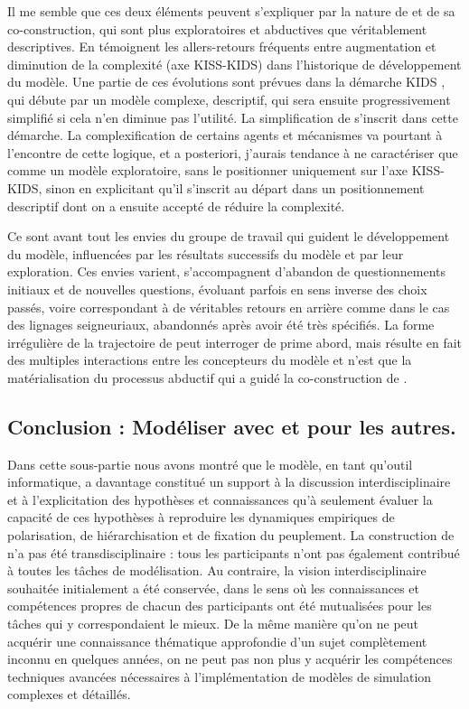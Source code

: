 Il me semble que ces deux éléments peuvent s'expliquer par la nature de \simfeodal{} et de sa co-construction, qui sont plus exploratoires et abductives que véritablement descriptives.
En témoignent les allers-retours fréquents entre augmentation et diminution de la complexité (axe KISS-KIDS) dans l'historique de développement du modèle.
Une partie de ces évolutions sont prévues dans la démarche KIDS \autocite{edmonds_kiss_2005}, qui débute par un modèle \og complexe\fg{}, descriptif, qui sera ensuite progressivement simplifié si cela n'en diminue pas l'utilité.
La \og simplification\fg{} de \simfeodal{} s'inscrit dans cette démarche.
La complexification de certains agents et mécanismes va pourtant à l'encontre de cette logique, et a posteriori, j'aurais tendance à ne caractériser \simfeodal{} que comme un modèle exploratoire, sans le positionner uniquement sur l'axe KISS-KIDS, sinon en explicitant qu'il s'inscrit au départ dans un positionnement descriptif dont on a ensuite accepté de réduire la complexité.

Ce sont avant tout les envies du groupe de travail qui guident le développement du modèle, influencées par les résultats successifs du modèle et par leur exploration.
Ces envies varient, s'accompagnent d'abandon de questionnements initiaux et de nouvelles questions, évoluant parfois en sens inverse des choix passés, voire correspondant à de véritables \og retours en arrière\fg{} comme dans le cas des lignages seigneuriaux, abandonnés après avoir été très spécifiés.
La forme irrégulière de la trajectoire de \simfeodal{} peut interroger de prime abord, mais résulte en fait des multiples interactions entre les concepteurs du modèle et n'est que la matérialisation du processus abductif qui a guidé la co-construction de \simfeodal{}.

\subsection{Conclusion : Modéliser avec et pour les autres.}

Dans cette sous-partie nous avons montré que le modèle, en tant qu'outil informatique, a davantage constitué un support à la discussion interdisciplinaire et à l'explicitation des hypothèses et connaissances qu'à seulement évaluer la capacité de ces hypothèses à reproduire les dynamiques empiriques de polarisation, de hiérarchisation et de fixation du peuplement.
La construction de \simfeodal{} n'a pas été transdisciplinaire :
	tous les participants n'ont pas également contribué à toutes les tâches de modélisation.
Au contraire, la vision interdisciplinaire souhaitée initialement a été conservée, dans le sens où les connaissances et compétences propres de chacun des participants ont été mutualisées pour les tâches qui y correspondaient le mieux.
De la même manière qu'on ne peut acquérir une connaissance thématique approfondie d'un sujet complètement inconnu en quelques années, on ne peut pas non plus y acquérir les compétences techniques avancées nécessaires à l'implémentation de modèles de simulation complexes et détaillés.

